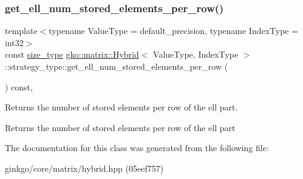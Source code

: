 \subsubsection{\texorpdfstring{get\+\_\+ell\+\_\+num\+\_\+stored\+\_\+elements\+\_\+per\+\_\+row()}{get\_ell\_num\_stored\_elements\_per\_row()}}
{\footnotesize\ttfamily template$<$typename Value\+Type = default\+\_\+precision, typename Index\+Type = int32$>$ \\
const \hyperlink{namespacegko_a6e5c95df0ae4e47aab2f604a22d98ee7}{size\+\_\+type} \hyperlink{classgko_1_1matrix_1_1Hybrid}{gko\+::matrix\+::\+Hybrid}$<$ Value\+Type, Index\+Type $>$\+::strategy\+\_\+type\+::get\+\_\+ell\+\_\+num\+\_\+stored\+\_\+elements\+\_\+per\+\_\+row (\begin{DoxyParamCaption}{ }\end{DoxyParamCaption}) const\hspace{0.3cm}{\ttfamily [inline]}, {\ttfamily [noexcept]}}



Returns the number of stored elements per row of the ell part. 

\begin{DoxyReturn}{Returns}
the number of stored elements per row of the ell part 
\end{DoxyReturn}


The documentation for this class was generated from the following file\+:\begin{DoxyCompactItemize}
\item 
ginkgo/core/matrix/hybrid.\+hpp (05eef757)\end{DoxyCompactItemize}
